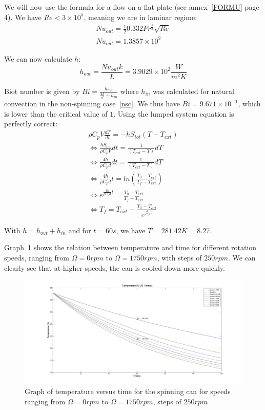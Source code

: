 \documentclass{report}
\begin{document}
	We will now use the formula for a flow on a flat plate (see annex~\ref{FORMU} page 4). We have $Re<3\times 10^5$, meaning we are in laminar regime:
	\begin{equation}
		\begin{gathered}
		Nu_{out}= \frac{1}{2}0.332Pr^{\frac{1}{3}}\sqrt{Re}\\
		Nu_{out}=1.3857\times 10^2
		\end{gathered}
	\end{equation}
	
	We can now calculate $h$:
	\begin{equation}
	h_{out}=\frac{Nu_{out}k}{L}=3.9029\times 10^2 \frac{W}{m^2K}
	\end{equation}
	
	Biot number is given by $Bi=\frac{h_{out}}{{\frac{4k}{d}+h_{in}}}$ where $h_{in}$ was calculated for natural convection in the non-spinning case~\ref{nsc}. We thus have $Bi=9.671\times 10^{-1}$, which is lower than the critical value of $1$. Using the lumped system equation is perfectly correct:
	\begin{equation}
	\begin{gathered}
	\rho C_pV\frac{dT}{dt}=-hS_{tot}(T-T_{ext})\\
	\Leftrightarrow \frac{hS_{tot}}{\rho C_pV}dt=\frac{1}{(T_{ext}-T)}dT\\
	\Leftrightarrow \frac{4h}{\rho C_pd}dt=\frac{1}{(T_{ext}-T)}dT\\
	\Leftrightarrow \frac{4h}{\rho C_pd}t=ln(\frac{T_0-T_{ext}}{T_f-T_{ext}})\\
	\Leftrightarrow e^{\frac{4h}{\rho C_pd}t}=\frac{T_0-T_{ext}}{T_f-T_{ext}}\\
	\Leftrightarrow T_f=T_{ext}+\frac{T_0-T_{ext}}{e^{\frac{4h}{\rho C_pd}t}}
	\end{gathered}
	\end{equation}

	With $h=h_{out}+h_{in}$ and for $t=60s$, we have $T=281.42K=8.27$\textcelsius.
	
	Graph~\ref{Sg} shows the relation between temperature and time for different rotation speeds, ranging from $\Omega=0rpm$ to $\Omega=1750rpm$, with steps of $250rpm$. We can clearly see that at higher speeds, the can is cooled down more quickly.
	
	\begin{figure}
		\centering
		\includegraphics[width=\textwidth]{img/Sg.jpg}
		\caption{Graph of temperature versus time for the spinning can for speeds ranging from $\Omega=0rpm$ to $\Omega=1750rpm$, steps of $250rpm$}
		\label{Sg}
	\end{figure}
	
\end{document}
